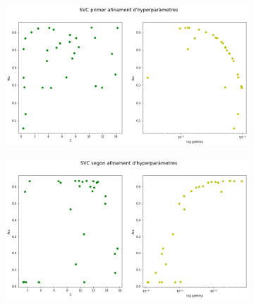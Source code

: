 \documentclass[12pt, spanish]{article}
\begin{document}
\begin{figure}
  \begin{subfigure}[t]{.47\textwidth}
    \centering
    \includegraphics[width=\linewidth]{images/hyper_svm1.png}
  \end{subfigure}
  \hfill
  \begin{subfigure}[t]{.47\textwidth}
    \centering
    \includegraphics[width=\linewidth]{images/hyper_svm2.png}
  \end{subfigure}

  \medskip


\end{figure}
\end{document}
